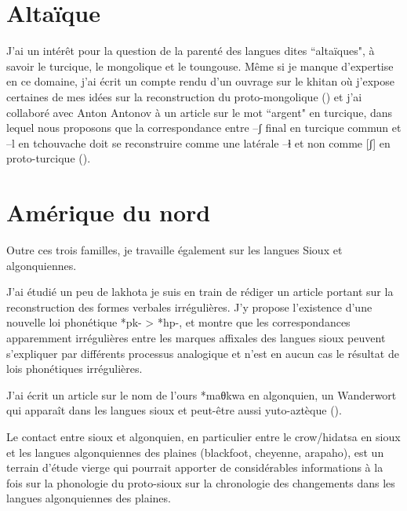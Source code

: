 \documentclass[oldfontcommands,oneside,a4paper,11pt]{memoir}
\begin{document}
\section{Altaïque}

J'ai un intérêt pour la question de la parenté des langues dites ``altaïques", à savoir le turcique, le mongolique et le toungouse. Même si je manque d'expertise en ce domaine, j'ai écrit un compte rendu d'un ouvrage sur le khitan où j'expose certaines de mes idées sur la reconstruction du proto-mongolique (\citealt{jacques10kitan}) et j'ai collaboré avec Anton Antonov à un article sur le mot ``argent" en turcique, dans lequel nous proposons que la correspondance entre --ʃ final en turcique commun et --l  en tchouvache doit se reconstruire comme une latérale --ɬ et non comme [ʃ] en proto-turcique (\citealt{antonov12kumush}).


\section{Amérique du nord}
Outre ces trois familles, je travaille également sur les langues Sioux et algonquiennes. 

J'ai étudié un peu de lakhota je suis en train de rédiger un article portant sur la reconstruction des formes verbales irrégulières. J'y propose l'existence d'une nouvelle loi phonétique *pk- > *hp-, et montre que les correspondances apparemment irrégulières entre les marques affixales des langues sioux peuvent s'expliquer par différents processus analogique et n'est en aucun cas le résultat de lois phonétiques irrégulières.  

J'ai écrit un article sur le nom de l'ours *maθkwa en algonquien, un Wanderwort qui apparaît dans les langues sioux et peut-être aussi yuto-aztèque (\citealt{jacques12bear}).

Le contact entre sioux et algonquien, en particulier entre le crow/hidatsa en sioux et les langues algonquiennes des plaines (blackfoot, cheyenne, arapaho), est un terrain d'étude vierge qui pourrait apporter de considérables informations à la fois sur la phonologie du proto-sioux sur la chronologie des changements dans les langues algonquiennes des plaines.
\end{document}

